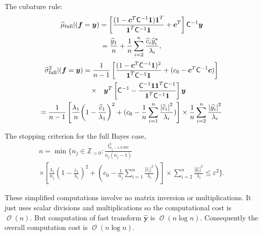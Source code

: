 \documentclass[twocolumn]{svjour3}          %
\DeclareMathOperator{\Order}{{\mathcal O}}
\newcommand{\bm}[1]{\boldsymbol{#1}}
\newcommand{\posIntegers}{\mathbb{Z}_{> 0}}
\newcommand{\vc}{\bm{c}}
\newcommand{\vf}{\bm{f}}
\newcommand{\vy}{\bm{y}}
\newcommand{\vone}{\bm{1}}
\newcommand{\mC}{\mathsf{C}}
\def\abs#1{\ensuremath{\left \lvert #1 \right \rvert}}
\begin{document}
The cubature rule:
\begin{multline}\label{FJH:eq:cubFull}
\widehat{\mu}_{\textup{full}}  \vert ( \vf = \vy) = \left[\frac{(1 -  \vc^T \mC^{-1}\vone)\vone^T}{\vone^T \mC^{-1} \vone} + \vc^T \right] \mC^{-1}  \vy 
\\
= 
 \frac{\widehat{y}_1}{n} +
 \frac 1n \sum_{i=2}^n \frac{ \widehat{c}_i \widehat{y}_i^*}{\lambda_i},
\end{multline}
\begin{multline} %
\widehat{\sigma}^2_{\textup{full}}  \vert ( \vf = \vy)  
= \frac{1}{n-1}
\left[\frac{(1 - \vc^T \mC^{-1} \vone)^2}{\vone^T \mC^{-1} \vone} + (c_0  -\vc ^T \mC^{-1} \vc) \right] 
\\
\nonumber
\qquad \times \quad \vy^T\left[ \mC^{-1} 
- \frac{ \mC^{-1} \vone\vone^T \mC^{-1}}{\vone^T \mC^{-1} \vone}  \right]\vy 
\\ \nonumber
=
\frac{1}{n-1} \left[\frac{\lambda_1}{n}{\left(1 - \frac{\widehat{c}_1}{\lambda_1}\right)^2} + (c_0  - \frac 1n \sum_{i=1}^n \frac{\abs{\widehat{c}_i}^2}{\lambda_i}) \right] 
\times
\frac{1}{n} \sum_{i=2}^n \frac{\abs{\widehat{y_i}}^2}{\lambda_i}
\end{multline}

The stopping criterion for the full Bayes case,  
\begin{multline} \label{FJH:eq:stopcritHyper}
n  = \min \biggl \{n_j \in \posIntegers:  
\frac {t_{n_j-1,0.995}^2}{n_j(n_j - 1)} 
\\ \times
\left[\frac{\lambda_1}{n_j}{\left(1 - \frac{\widehat{c}_1}{\lambda_1}\right)^2} + (c_0  - \frac{1}{n_j} \sum_{i=1}^n \frac{\abs{\widehat{c}_i}^2}{\lambda_i}) \right] 
\times 
\sum_{i=2}^n \frac{\abs{\widehat{y_i}}^2}{\lambda_i} 
\le \varepsilon^2 \biggr\}.
\end{multline}


These simplified computations involve no matrix inversion or multiplications. 
It just uses scalar divisions and multiplications so the computational cost is $\Order(n)$. 
But computation of fast transform $\widehat{\vy}$ is $\Order(n \log n)$.  Consequently the overall computation cost is $\Order(n \log n )$. 
\end{document}
